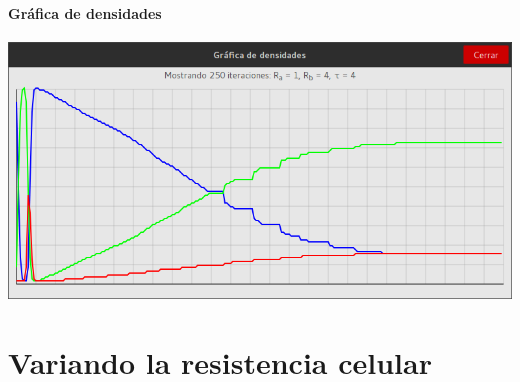 \documentclass[12pt,letterpaper,oneside]{report}
\begin{document}
	\subsubsection{Gráfica de densidades}
	\begin{center}
		\includegraphics[width=14cm]{img/original/max/g.png}
	\end{center}


	\chapter{Variando la resistencia celular}
\end{document}
